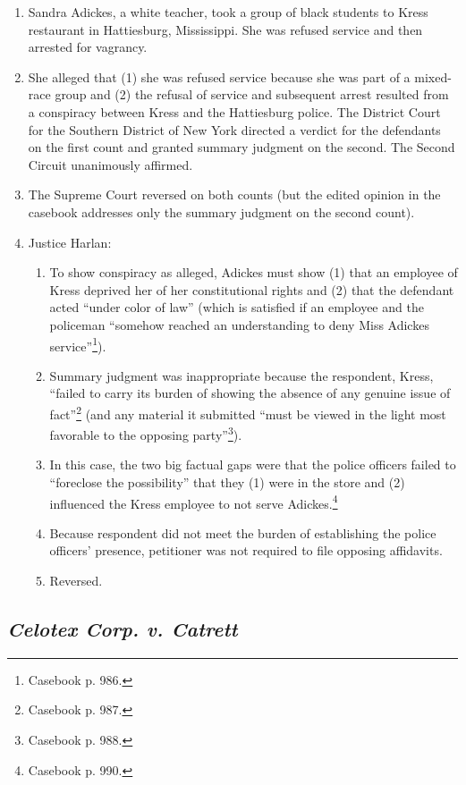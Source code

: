 \begin{enumerate}
    \item Sandra Adickes, a white teacher, took a group of black students to Kress restaurant in Hattiesburg, Mississippi. She was refused service and then arrested for vagrancy.
    \item She alleged that (1) she was refused service because she was part of a mixed-race group and (2) the refusal of service and subsequent arrest resulted from a conspiracy between Kress and the Hattiesburg police. The District Court for the Southern District of New York directed a verdict for the defendants on the first count and granted summary judgment on the second. The Second Circuit unanimously affirmed.
    \item The Supreme Court reversed on both counts (but the edited opinion in the casebook addresses only the summary judgment on the second count).
    \item Justice Harlan:
    \begin{enumerate}
        \item To show conspiracy as alleged, Adickes must show (1) that an employee of Kress deprived her of her constitutional rights and (2) that the defendant acted ``under color of law'' (which is satisfied if an employee and the policeman ``somehow reached an understanding to deny Miss Adickes service''\footnote{Casebook p. 986.}).
        \item Summary judgment was inappropriate because the respondent, Kress, ``failed to carry its burden of showing the absence of any genuine issue of fact''\footnote{Casebook p. 987.} (and any material it submitted ``must be viewed in the light most favorable to the opposing party''\footnote{Casebook p. 988.}).
        \item In this case, the two big factual gaps were that the police officers failed to ``foreclose the possibility'' that they (1) were in the store and (2) influenced the Kress employee to not serve Adickes.\footnote{Casebook p. 990.}
        \item Because respondent did not meet the burden of establishing the police officers' presence, petitioner was not required to file opposing affidavits.
        \item Reversed.
    \end{enumerate}
\end{enumerate}

\subsection{\emph{Celotex Corp. v. Catrett}}

